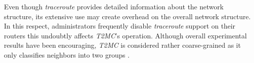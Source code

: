Even though {\sl traceroute}
provides detailed information about the network structure, 
its extensive use may create overhead on the overall network structure. 
In this respect, administrators frequently
disable {\sl traceroute} support on their routers this 
undoubtly affects \emph{T2MC}'s operation.
Although overall experimental results have been encouraging, 
\emph{T2MC} is considered rather coarse-grained as it only
classifies neighbors into two groups \cite{QLZG2009}.
%
%
%
%
